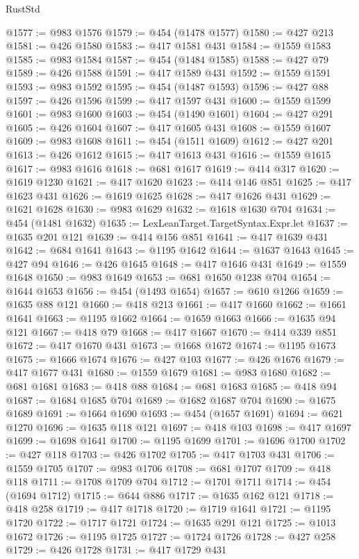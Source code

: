 \begin{lexlean}{RustStd}
\begin{coremodule}
{\begin{coremodule}
{{{{{{{{{{{{{{{{{{{{{{{{{{{{{{{{@1577 := @983 @1576
@1579 := @454 (@1478 @1577)
@1580 := @427 @213
@1581 := @426 @1580
@1583 := @417 @1581 @431
@1584 := @1559 @1583
@1585 := @983 @1584
@1587 := @454 (@1484 @1585)
@1588 := @427 @79
@1589 := @426 @1588
@1591 := @417 @1589 @431
@1592 := @1559 @1591
@1593 := @983 @1592
@1595 := @454 (@1487 @1593)
@1596 := @427 @88
@1597 := @426 @1596
@1599 := @417 @1597 @431
@1600 := @1559 @1599
@1601 := @983 @1600
@1603 := @454 (@1490 @1601)
@1604 := @427 @291
@1605 := @426 @1604
@1607 := @417 @1605 @431
@1608 := @1559 @1607
@1609 := @983 @1608
@1611 := @454 (@1511 @1609)
@1612 := @427 @201
@1613 := @426 @1612
@1615 := @417 @1613 @431
@1616 := @1559 @1615
@1617 := @983 @1616
@1618 := @681 @1617
@1619 := @414 @317
@1620 := @1619 @1230
@1621 := @417 @1620
@1623 := @414 @146 @851
@1625 := @417 @1623 @431
@1626 := @1619 @1625
@1628 := @417 @1626 @431
@1629 := @1621 @1628
@1630 := @983 @1629
@1632 := @1618 @1630 @704
@1634 := @454 (@1481 @1632)
@1635 := LexLeanTarget.TargetSyntax.Expr.let
@1637 := @1635 @201 @121
@1639 := @414 @156 @851
@1641 := @417 @1639 @431
@1642 := @684 @1641
@1643 := @1195 @1642
@1644 := @1637 @1643
@1645 := @427 @94
@1646 := @426 @1645
@1648 := @417 @1646 @431
@1649 := @1559 @1648
@1650 := @983 @1649
@1653 := @681 @1650 @1238 @704
@1654 := @1644 @1653
@1656 := @454 (@1493 @1654)
@1657 := @610 @1266
@1659 := @1635 @88 @121
@1660 := @418 @213
@1661 := @417 @1660
@1662 := @1661 @1641
@1663 := @1195 @1662
@1664 := @1659 @1663
@1666 := @1635 @94 @121
@1667 := @418 @79
@1668 := @417 @1667
@1670 := @414 @339 @851
@1672 := @417 @1670 @431
@1673 := @1668 @1672
@1674 := @1195 @1673
@1675 := @1666 @1674
@1676 := @427 @103
@1677 := @426 @1676
@1679 := @417 @1677 @431
@1680 := @1559 @1679
@1681 := @983 @1680
@1682 := @681 @1681
@1683 := @418 @88
@1684 := @681 @1683
@1685 := @418 @94
@1687 := @1684 @1685 @704
@1689 := @1682 @1687 @704
@1690 := @1675 @1689
@1691 := @1664 @1690
@1693 := @454 (@1657 @1691)
@1694 := @621 @1270
@1696 := @1635 @118 @121
@1697 := @418 @103
@1698 := @417 @1697
@1699 := @1698 @1641
@1700 := @1195 @1699
@1701 := @1696 @1700
@1702 := @427 @118
@1703 := @426 @1702
@1705 := @417 @1703 @431
@1706 := @1559 @1705
@1707 := @983 @1706
@1708 := @681 @1707
@1709 := @418 @118
@1711 := @1708 @1709 @704
@1712 := @1701 @1711
@1714 := @454 (@1694 @1712)
@1715 := @644 @886
@1717 := @1635 @162 @121
@1718 := @418 @258
@1719 := @417 @1718
@1720 := @1719 @1641
@1721 := @1195 @1720
@1722 := @1717 @1721
@1724 := @1635 @291 @121
@1725 := @1013 @1672
@1726 := @1195 @1725
@1727 := @1724 @1726
@1728 := @427 @258
@1729 := @426 @1728
@1731 := @417 @1729 @431
}}}}}}}}}}}}}}}}}}}}}}}}}}}}}}}}
\end{coremodule}}
\end{coremodule}
\end{lexlean}
